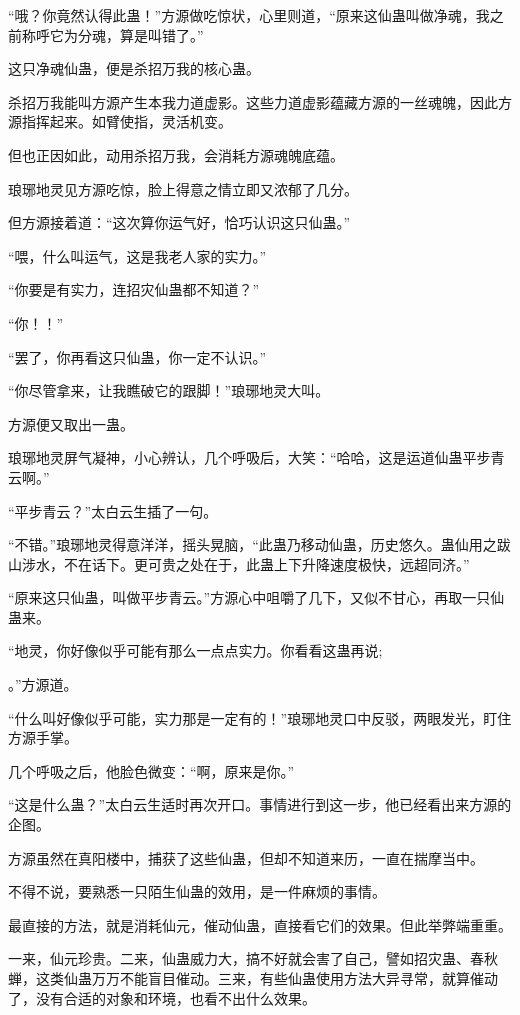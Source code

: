 \begin{this_body}
“哦？你竟然认得此蛊！”方源做吃惊状，心里则道，“原来这仙蛊叫做净魂，我之前称呼它为分魂，算是叫错了。”

这只净魂仙蛊，便是杀招万我的核心蛊。

杀招万我能叫方源产生本我力道虚影。这些力道虚影蕴藏方源的一丝魂魄，因此方源指挥起来。如臂使指，灵活机变。

但也正因如此，动用杀招万我，会消耗方源魂魄底蕴。

琅琊地灵见方源吃惊，脸上得意之情立即又浓郁了几分。

但方源接着道：“这次算你运气好，恰巧认识这只仙蛊。”

“喂，什么叫运气，这是我老人家的实力。”

“你要是有实力，连招灾仙蛊都不知道？”

“你！！”

“罢了，你再看这只仙蛊，你一定不认识。”

“你尽管拿来，让我瞧破它的跟脚！”琅琊地灵大叫。

方源便又取出一蛊。

琅琊地灵屏气凝神，小心辨认，几个呼吸后，大笑：“哈哈，这是运道仙蛊平步青云啊。”

“平步青云？”太白云生插了一句。

“不错。”琅琊地灵得意洋洋，摇头晃脑，“此蛊乃移动仙蛊，历史悠久。蛊仙用之跋山涉水，不在话下。更可贵之处在于，此蛊上下升降速度极快，远超同济。”

“原来这只仙蛊，叫做平步青云。”方源心中咀嚼了几下，又似不甘心，再取一只仙蛊来。

“地灵，你好像似乎可能有那么一点点实力。你看看这蛊再说;

。”方源道。

“什么叫好像似乎可能，实力那是一定有的！”琅琊地灵口中反驳，两眼发光，盯住方源手掌。

几个呼吸之后，他脸色微变：“啊，原来是你。”

“这是什么蛊？”太白云生适时再次开口。事情进行到这一步，他已经看出来方源的企图。

方源虽然在真阳楼中，捕获了这些仙蛊，但却不知道来历，一直在揣摩当中。

不得不说，要熟悉一只陌生仙蛊的效用，是一件麻烦的事情。

最直接的方法，就是消耗仙元，催动仙蛊，直接看它们的效果。但此举弊端重重。

一来，仙元珍贵。二来，仙蛊威力大，搞不好就会害了自己，譬如招灾蛊、春秋蝉，这类仙蛊万万不能盲目催动。三来，有些仙蛊使用方法大异寻常，就算催动了，没有合适的对象和环境，也看不出什么效果。


\end{this_body}
